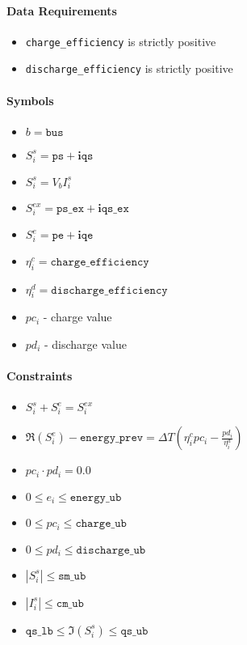 \documentclass{article}
\begin{document}
\paragraph{Data Requirements}
\begin{itemize}
    \item \texttt{charge\_efficiency} is strictly positive
    \item \texttt{discharge\_efficiency} is strictly positive
\end{itemize}

\paragraph{Symbols}
\begin{itemize}
    \item $b = \texttt{bus}$
    \item $S^s_i = \texttt{ps} + \bm i \texttt{qs}$
    \item $S^s_i = V_b I^s_i$
    \item $S^{ex}_i = \texttt{ps\_ex} + \bm i \texttt{qs\_ex}$
    \item $S^e_i = \texttt{pe} + \bm i \texttt{qe}$
    \item $\eta^c_i = \texttt{charge\_efficiency}$
    \item $\eta^d_i = \texttt{discharge\_efficiency}$
    \item $pc_i$ - charge value
    \item $pd_i$ - discharge value
\end{itemize}

\paragraph{Constraints}
\begin{itemize}
    \item $S^s_i + S^e_i = S^{ex}_i $ %
    \item $\Re(S^e_i)- \texttt{energy\_prev} = \Delta T \left( \eta^c_i pc_i - \frac{pd_i}{\eta^d_i} \right)$
    \item $pc_i \cdot pd_i = 0.0$
    \item $0 \leq e_i \leq \texttt{energy\_ub}$
    \item $0 \leq pc_i \leq \texttt{charge\_ub}$
    \item $0 \leq pd_i \leq \texttt{discharge\_ub}$
    \item $|S^s_i| \leq \texttt{sm\_ub}$
    \item $|I^s_i| \leq \texttt{cm\_ub}$
    \item $\texttt{qs\_lb} \leq \Im(S^s_i) \leq \texttt{qs\_ub}$
\end{itemize}
\end{document}
